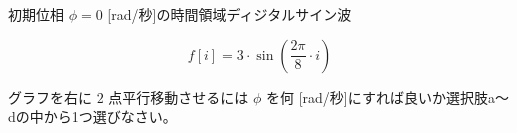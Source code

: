 初期位相 $\phi = 0$ [rad/秒]の時間領域ディジタルサイン波 

\[
f[i] = 3 \cdot \sin \left ( \frac{2 \pi}{8}  \cdot i \right )
\]

\noindent グラフを右に $2$ 点平行移動させるには $\phi$ を何 [rad/秒]にすれば良いか選択肢a〜dの中から1つ選びなさい。
